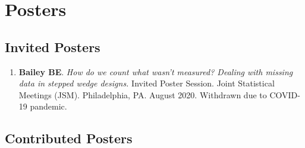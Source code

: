 \documentclass[
  fleqn, oneside]{article}
\providecommand{\tightlist}{%
  \setlength{\itemsep}{0pt}\setlength{\parskip}{0pt}}
\begin{document}
\hypertarget{posters}{%
\section{Posters}\label{posters}}

\hypertarget{invited-posters}{%
\subsection{Invited Posters}\label{invited-posters}}

\begin{enumerate}
\def\labelenumi{\arabic{enumi}.}
\tightlist
\item
  \textbf{Bailey BE}. \emph{How do we count what wasn't measured?
  Dealing with missing data in stepped wedge designs.} Invited Poster
  Session. Joint Statistical Meetings (JSM). Philadelphia, PA. August
  2020. Withdrawn due to COVID-19 pandemic.
\end{enumerate}

\hypertarget{contributed-posters}{%
\subsection{Contributed Posters}\label{contributed-posters}}
\end{document}
